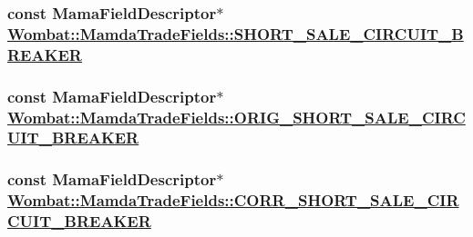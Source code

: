 \hypertarget{classWombat_1_1MamdaTradeFields_08935a4c527a67f176bfff17d0edff54}{
\subsubsection[SHORT\_\-SALE\_\-CIRCUIT\_\-BREAKER]{\setlength{\rightskip}{0pt plus 5cm}const Mama\-Field\-Descriptor$\ast$ \hyperlink{classWombat_1_1MamdaTradeFields_08935a4c527a67f176bfff17d0edff54}{Wombat::Mamda\-Trade\-Fields::SHORT\_\-SALE\_\-CIRCUIT\_\-BREAKER}}}
\label{classWombat_1_1MamdaTradeFields_08935a4c527a67f176bfff17d0edff54}


\hypertarget{classWombat_1_1MamdaTradeFields_44d45b6dc1a8124b717c6c55124bde43}{
\subsubsection[ORIG\_\-SHORT\_\-SALE\_\-CIRCUIT\_\-BREAKER]{\setlength{\rightskip}{0pt plus 5cm}const Mama\-Field\-Descriptor$\ast$ \hyperlink{classWombat_1_1MamdaTradeFields_44d45b6dc1a8124b717c6c55124bde43}{Wombat::Mamda\-Trade\-Fields::ORIG\_\-SHORT\_\-SALE\_\-CIRCUIT\_\-BREAKER}}}
\label{classWombat_1_1MamdaTradeFields_44d45b6dc1a8124b717c6c55124bde43}


\hypertarget{classWombat_1_1MamdaTradeFields_1f5755c44eb2062a5e78ede6dd1fbe89}{
\subsubsection[CORR\_\-SHORT\_\-SALE\_\-CIRCUIT\_\-BREAKER]{\setlength{\rightskip}{0pt plus 5cm}const Mama\-Field\-Descriptor$\ast$ \hyperlink{classWombat_1_1MamdaTradeFields_1f5755c44eb2062a5e78ede6dd1fbe89}{Wombat::Mamda\-Trade\-Fields::CORR\_\-SHORT\_\-SALE\_\-CIRCUIT\_\-BREAKER}}}
\label{classWombat_1_1MamdaTradeFields_1f5755c44eb2062a5e78ede6dd1fbe89}


